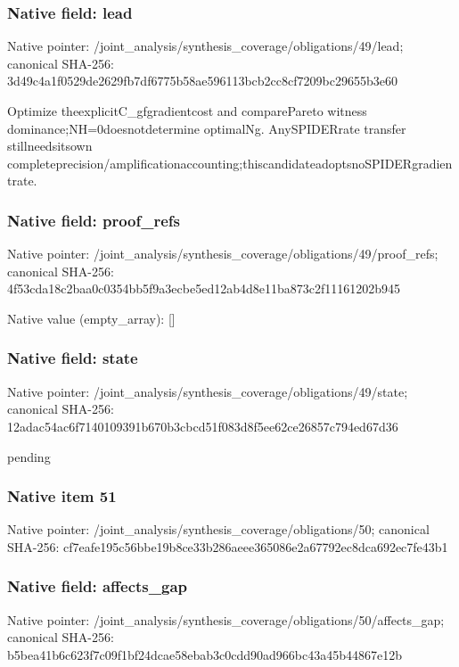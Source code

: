 \documentclass[10pt,a4paper]{article}
\begin{document}
\subsubsection{Native field: lead}
Native pointer: /joint\_\allowbreak{}analysis/synthesis\_\allowbreak{}coverage/obligations/49/lead; canonical SHA-256: 3d49c4a1f0529de2629fb7df6775b58ae596113bcb2cc8cf7209bc29655b3e60

\begingroup\raggedright\sloppy Optimize theexplicitC\_\allowbreak{}gfgradientcost and comparePareto witness dominance;\allowbreak{}NH=\allowbreak{}0doesnotdetermine optimalNg. AnySPIDERrate transfer stillneedsitsown completeprecision/\allowbreak{}amplificationaccounting;\allowbreak{}thiscandidateadoptsnoSPIDERgradientrate.\par\endgroup

\subsubsection{Native field: proof\_\allowbreak{}refs}
Native pointer: /joint\_\allowbreak{}analysis/synthesis\_\allowbreak{}coverage/obligations/49/proof\_\allowbreak{}refs; canonical SHA-256: 4f53cda18c2baa0c0354bb5f9a3ecbe5ed12ab4d8e11ba873c2f11161202b945

Native value (empty\_\allowbreak{}array): []

\subsubsection{Native field: state}
Native pointer: /joint\_\allowbreak{}analysis/synthesis\_\allowbreak{}coverage/obligations/49/state; canonical SHA-256: 12adac54ac6f7140109391b670b3cbcd51f083d8f5ee62ce26857c794ed67d36

\begingroup\raggedright\sloppy pending\par\endgroup

\subsubsection{Native item 51}
Native pointer: /joint\_\allowbreak{}analysis/synthesis\_\allowbreak{}coverage/obligations/50; canonical SHA-256: cf7eafe195c56bbe19b8ce33b286aeee365086e2a67792ec8dca692ec7fe43b1

\subsubsection{Native field: affects\_\allowbreak{}gap}
Native pointer: /joint\_\allowbreak{}analysis/synthesis\_\allowbreak{}coverage/obligations/50/affects\_\allowbreak{}gap; canonical SHA-256: b5bea41b6c623f7c09f1bf24dcae58ebab3c0cdd90ad966bc43a45b44867e12b
\end{document}
